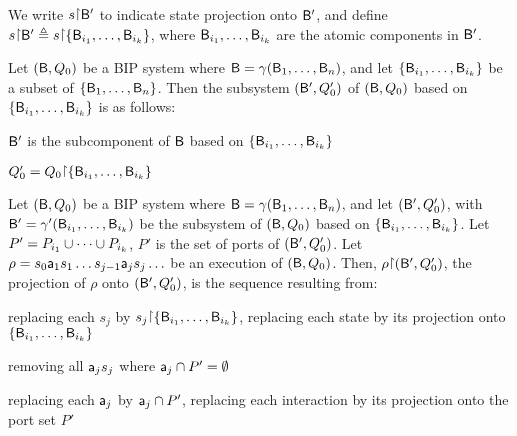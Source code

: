 We write $s \pj \B'$ to indicate state projection onto $\mathsf{B}'$, and define 
$s \pj \B' \df  s \pj \set{\B_{i_1}, \dots, \B_{i_k}}$, where $\mathsf{B}_{i_1},\dots,\mathsf{B}_{i_k}$ are the atomic
components in $\mathsf{B}'$.





\begin{definition}[Subsystem]\label{def.bip.subsystem}
Let $(\mathsf{B}, Q_0)$ be a BIP system where $\mathsf{B} = \gamma(\mathsf{B}_1,\dots,\mathsf{B}_n)$, and let 
$\{ \mathsf{B}_{i_1},\dots,\mathsf{B}_{i_k} \}$ be a subset of $\{ \mathsf{B}_{1},\dots,\mathsf{B}_{n} \}$.
Then the subsystem $(\mathsf{B}', Q'_0)$ of  $(\mathsf{B}, Q_0)$ based on $\{ \mathsf{B}_{i_1},\dots,\mathsf{B}_{i_k} \}$ is as follows:
\bn
\item $\mathsf{B}'$ is the subcomponent of $\mathsf{B}$ based on $\{ \mathsf{B}_{i_1},\dots,\mathsf{B}_{i_k} \}$ 
\item $Q'_0 = Q_0 \pj \set{\B_{i_1},\dots,\B_{i_k}}$
\en
\end{definition}


\begin{definition}\label{def.bip.execution.projection}
Let $(\mathsf{B}, Q_0)$ be a BIP system where $\mathsf{B} = \gamma(\mathsf{B}_1,\dots,\mathsf{B}_n)$, and let $(\mathsf{B}', Q'_0)$, with $\mathsf{B}'
= \gamma'(\mathsf{B}_{i_1},\dots,\mathsf{B}_{i_k})$ be the subsystem of $(\mathsf{B}, Q_0)$ based on $\{ \mathsf{B}_{i_1},\dots,\mathsf{B}_{i_k} \}$.
Let $P' = P_{i_1} \cup \cdots \cup P_{i_k}$, \ie $P'$ is the set of ports of $(\mathsf{B}', Q'_0)$.
%
Let $\rho = s_0 \mathsf{a}_1 s_1 \ldots s_{j-1} \mathsf{a}_j s_j \ldots$ be an execution of $(\mathsf{B}, Q_0)$.  Then, $\rho \pj (\B', Q'_0)$, the projection
of $\rho$ onto $(\mathsf{B}', Q'_0)$, is the sequence resulting from:
\bn
\item \label{def.clause.bip.execution.projection.state} 
replacing each $s_j$ by $s_j \pj \set{\B_{i_1},\dots,\B_{i_k}}$, \ie replacing each state by its projection onto $\{ \mathsf{B}_{i_1},\dots,\mathsf{B}_{i_k} \}$

\item \label{def.clause.bip.execution.projection.action} removing all $\mathsf{a}_j s_j$ where $\mathsf{a}_j \cap P' = \emptyset$   %

\item \label{def.clause.bip.execution.projection.port} replacing each $\mathsf{a}_j$ by $\mathsf{a}_j \cap P'$, \ie replacing each
interaction by its projection onto the port set $P'$ 

\en
\end{definition}



